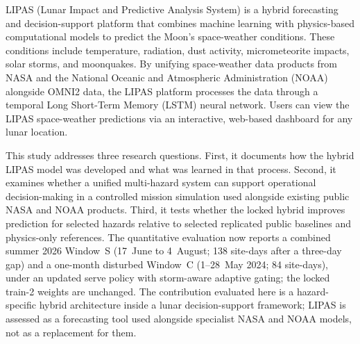 LIPAS (Lunar Impact and Predictive Analysis System) is a hybrid forecasting and decision-support platform that combines machine learning with physics-based computational models to predict the Moon's space-weather conditions. These conditions include temperature, radiation, dust activity, micrometeorite impacts, solar storms, and moonquakes. By unifying space-weather data products from NASA and the National Oceanic and Atmospheric Administration (NOAA) alongside OMNI2 data, the LIPAS platform processes the data through a temporal Long Short-Term Memory (LSTM) neural network. Users can view the LIPAS space-weather predictions via an interactive, web-based dashboard for any lunar location.

This study addresses three research questions. First, it documents how the hybrid LIPAS model was developed and what was learned in that process. Second, it examines whether a unified multi-hazard system can support operational decision-making in a controlled mission simulation used alongside existing public NASA and NOAA products. Third, it tests whether the locked hybrid improves prediction for selected hazards relative to selected replicated public baselines and physics-only references. The quantitative evaluation now reports a combined summer 2026 Window~S (17~June to 4~August; 138 site-days after a three-day gap) and a one-month disturbed Window~C (1--28~May 2024; 84 site-days), under an updated serve policy with storm-aware adaptive gating; the locked train-2 weights are unchanged. The contribution evaluated here is a hazard-specific hybrid architecture inside a lunar decision-support framework; LIPAS is assessed as a forecasting tool used alongside specialist NASA and NOAA models, not as a replacement for them.
